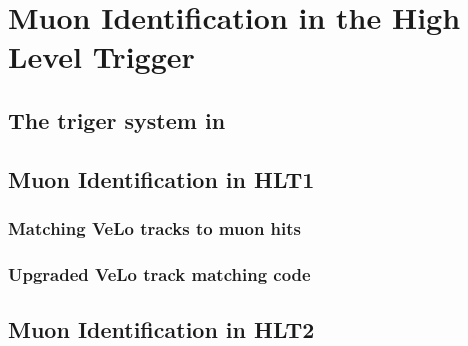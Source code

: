 
\chapter{Muon Identification in the \lhcb High Level Trigger}
\label{Muon_id_hlt}

\section{The \lhcb triger system in \runtwo}

\section{Muon Identification in HLT1}

\subsection{Matching VeLo tracks to muon hits}
\subsection{Upgraded VeLo track matching code}

\section{Muon Identification in HLT2}

